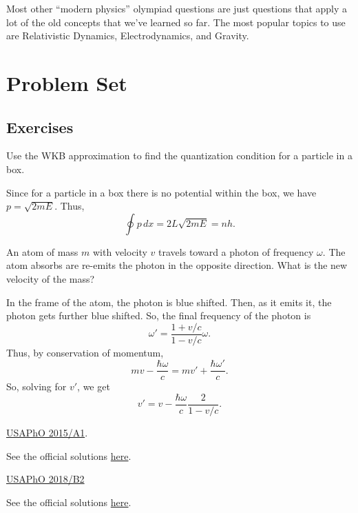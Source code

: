 \documentclass[11pt]{scrartcl}
\newcommand{\officialsol}[1]{See the official solutions \href{#1}{here}.}
\begin{document}
Most other ``modern physics'' olympiad questions are just questions that apply a lot of the old concepts that we’ve learned so far. The most popular topics to use are Relativistic Dynamics, Electrodynamics, and Gravity.

\section{Problem Set}

\subsection{Exercises}

\begin{prob}
    Use the WKB approximation to find the quantization condition for a particle in a box.
\end{prob}
\begin{sol}
    Since for a particle in a box there is no potential within the box, we have $p = \sqrt{2mE}$. Thus, 
    $$\oint p\, dx = \boxed{2L\sqrt{2mE} = nh}.$$
\end{sol}

\begin{prob}
    An atom of mass $m$ with velocity $v$ travels toward a photon of frequency $\omega$. The atom absorbs are re-emits the photon in the opposite direction. What is the new velocity of the mass?
\end{prob}
\begin{sol}
    In the frame of the atom, the photon is blue shifted. Then, as it emits it, the photon gets further blue shifted. So, the final frequency of the photon is
    $$\omega' = \frac{1 + v/c}{1-v/c}\omega.$$
    Thus, by conservation of momentum,
    $$mv - \frac{\hbar \omega}{c} = mv' + \frac{\hbar \omega'}{c}.$$
    So, solving for $v'$, we get
    $$v' = v - \frac{\hbar\omega}{c}\frac{2}{1-v/c}.$$
\end{sol}

\begin{prob}
    \href{https://aapt.org/physicsteam/2015/upload/E3-2-5.pdf#page=3}{USAPhO 2015/A1}.
\end{prob}
\begin{sol}
    \officialsol{https://aapt.org/physicsteam/upload/USAPhO-2015-Solutions.pdf}
\end{sol}

\begin{prob}
    \href{https://aapt.org/physicsteam/2019/upload/USAPhO-2018.pdf#page=8}{USAPhO 2018/B2}
\end{prob}
\begin{sol}
    \officialsol{https://aapt.org/physicsteam/upload/USAPhO-2018-Solutions.pdf}
\end{sol}
\end{document}
